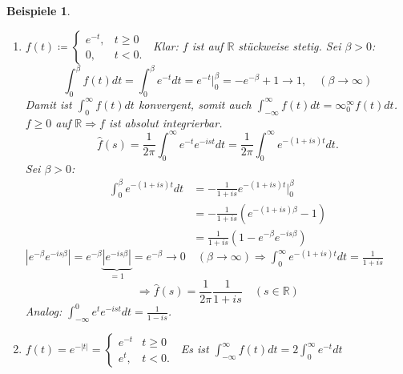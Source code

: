 \documentclass[12pt]{extreport} %
\newcommand{\R}{\mathbb{R}}
\theoremstyle{named}
\theoremstyle{nnamed}
\theoremstyle{itshape}
\theoremstyle{normal}
\newtheorem*{beispiele}{Beispiele}
\begin{document}
\begin{beispiele} ~\
		\begin{enumerate}
			\item $f(t) \coloneqq \begin{cases} e^{-t}, & t \geq 0 \\ 0, & t < 0. \end{cases}~$ Klar: $f$ ist auf $\R$ stückweise stetig. Sei $\beta > 0$: %
			$$ \int_{0}^{\beta} f(t) dt = \int_{0}^{\beta} e^{-t} dt = e^{-t} \Big|_{0}^{\beta} = -e^{-\beta} + 1 \longrightarrow 1, \quad (\beta \rightarrow \infty) $$
			Damit ist $\int_{0}^{\infty} f(t) dt$ konvergent, somit auch $\int_{-\infty}^{\infty} f(t) dt = \infty_{0}^{\infty} f(t) dt$. $f \geq 0$ auf $\R \Rightarrow f$ ist absolut integrierbar.
			$$ \hat{f}(s) = \frac{1}{2\pi} \int_{0}^{\infty} e^{-t} e^{-ist} dt = \frac{1}{2\pi} \int_{0}^{\infty} e^{-(1+is)t} dt. $$
			Sei $\beta > 0$:
			\begin{align*}
				\int_{0}^{\beta} e^{-(1+is)t} dt & = -\frac{1}{1+is} e^{-(1+is)t} \Big|_{0}^{\beta} \\
				& = - \frac{1}{1 + is} \left( e^{-(1+is)\beta} - 1 \right) \\
				& = \frac{1}{1 + is} \left( 1 - e^{-\beta} e^{-is\beta} \right)
			\end{align*}
			$\left| e^{-\beta} e^{-is\beta} \right| = e^{-\beta} \underbrace{\left| e^{-is\beta} \right|}_{=1} = e^{-\beta} \longrightarrow 0 \quad (\beta \rightarrow \infty) \Rightarrow \int_{0}^{\infty} e^{-(1+is)t} dt = \frac{1}{1 + is}$
			$$ \Longrightarrow \hat{f}(s) = \frac{1}{2\pi} \frac{1}{1 + is} \quad (s \in \R) $$
			Analog: $\int_{-\infty}^{0} e^{t} e^{-ist} dt = \frac{1}{1 - is}$. %
		\item $f(t) = e^{-|t|} = \begin{cases} e^{-t} & t \geq 0 \\ e^{t}, & t < 0. \end{cases}~$ Es ist $\int_{-\infty}^{\infty} f(t) dt = 2 \int_{0}^{\infty} e^{-t} dt$ 
		
			\bigskip
		

\end{enumerate}
\end{beispiele}
\end{document}

